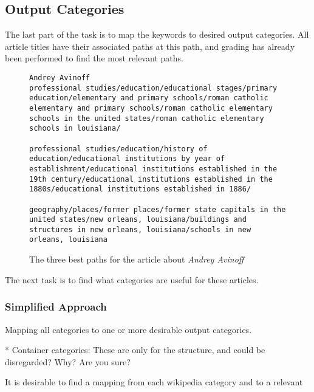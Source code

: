 \subsection{Output Categories}
The last part of the  task is to map the keywords to desired output categories. All article titles have their associated paths at this path, and grading has already been performed to find the most relevant paths.

\begin{figure}[h]
\centering
\begin{lstlisting}
Andrey Avinoff
professional studies/education/educational stages/primary education/elementary and primary schools/roman catholic elementary and primary schools/roman catholic elementary schools in the united states/roman catholic elementary schools in louisiana/

professional studies/education/history of education/educational institutions by year of establishment/educational institutions established in the 19th century/educational institutions established in the 1880s/educational institutions established in 1886/

geography/places/former places/former state capitals in the united states/new orleans, louisiana/buildings and structures in new orleans, louisiana/schools in new orleans, louisiana
\end{lstlisting}
\caption{The three best paths for the article about \emph{Andrey Avinoff}}
\label{fig:andrey_avinoff}
\end{figure}

The next task is to find what categories are useful for these articles. 

\subsubsection{Simplified Approach}

Mapping all categories to one or more desirable output categories. 

* Container categories: These are only for the structure, and could be disregarded? Why? Are you sure?

It is desirable to find a mapping from each wikipedia category and to a relevant 